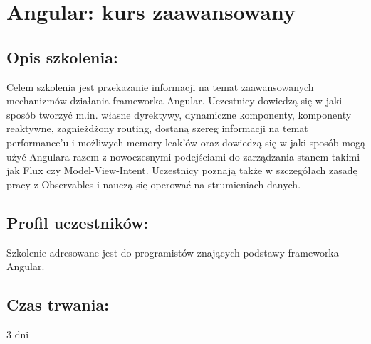 \documentclass{article}[10pt]
\begin{document}
\newpage


    
	\section{Angular: kurs zaawansowany}

	\subsection*{Opis szkolenia:}
	\begin{adjustwidth}{2cm}{}
\justifying
		
Celem szkolenia jest przekazanie informacji na temat zaawansowanych mechanizmów działania frameworka Angular. Uczestnicy dowiedzą się w jaki sposób tworzyć m.in. własne dyrektywy, dynamiczne komponenty, komponenty reaktywne, zagnieżdżony routing, dostaną szereg informacji na temat performance’u i możliwych memory leak’ów oraz dowiedzą się w jaki sposób mogą użyć Angulara razem z nowoczesnymi podejściami do zarządzania stanem takimi jak Flux czy Model-View-Intent.
Uczestnicy poznają także w szczegółach zasadę pracy z Observables i nauczą się operować na strumieniach danych.

	\end{adjustwidth}
	\subsection*{Profil uczestników:}
\begin{adjustwidth}{2cm}{}
\justifying
	
Szkolenie adresowane jest do programistów znających podstawy frameworka Angular.
\end{adjustwidth}
	\subsection*{Czas trwania:}
\begin{adjustwidth}{2cm}{}
	3 dni
\end{adjustwidth}
\end{document}
